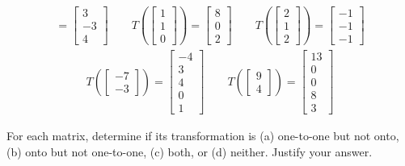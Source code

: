 \begin{tasks}[resume, style=enumerate]
\begin{align*}
    = \begin{bmatrix} 3 \\ -3 \\ 4 \end{bmatrix}
    \qquad
    T\left(\begin{bmatrix} 1 \\ 1 \\ 0 \end{bmatrix} \right)
    = \begin{bmatrix} 8 \\ 0 \\ 2 \end{bmatrix}
    \qquad
    T\left(\begin{bmatrix} 2 \\ 1 \\ 2 \end{bmatrix} \right)
    = \begin{bmatrix} -1 \\ -1 \\ -1 \end{bmatrix}
  \end{align*}
\task \faCalculator
  \begin{align*}
    T \left(\begin{bmatrix} -7 \\ -3 \end{bmatrix} \right)
    = \begin{bmatrix} -4 \\ 3 \\ 4 \\ 0 \\ 1 \end{bmatrix}
    \qquad
    T \left(\begin{bmatrix} 9 \\ 4 \end{bmatrix} \right)
    = \begin{bmatrix} 13 \\ 0 \\ 0 \\ 8 \\ 3 \end{bmatrix}
  \end{align*}
\end{tasks}
For each matrix, determine if its transformation is (a) one-to-one but
not onto, (b) onto but not one-to-one, (c) both, or (d)
neither. Justify your answer.
